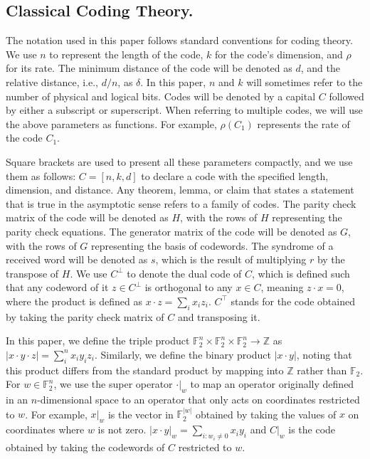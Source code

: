 \documentclass[manuscript,screen,review]{acmart}
\begin{document}
{%
%    


  \subsection{Classical Coding Theory.} \label{sec:classical} The notation used in this paper follows standard conventions for coding theory. We use $n$ to represent the length of the code, $k$ for the code's dimension, and $\rho$ for its rate. The minimum distance of the code will be denoted as $d$, and the relative distance, i.e., $d/n$, as $\delta$. In this paper, $n$ and $k$ will sometimes refer to the number of physical and logical bits. Codes will be denoted by a capital $C$ followed by either a subscript or superscript. When referring to multiple codes, we will use the above parameters as functions. For example, $\rho(C_{1})$ represents the rate of the code $C_{1}$.

Square brackets are used to present all these parameters compactly, and we use them as follows: $C=[n,k,d]$ to declare a code with the specified length, dimension, and distance. Any theorem, lemma, or claim that states a statement that is true in the asymptotic sense refers to a family of codes. The parity check matrix of the code will be denoted as $H$, with the rows of $H$ representing the parity check equations. The generator matrix of the code will be denoted as $G$, with the rows of $G$ representing the basis of codewords. The syndrome of a received word will be denoted as $s$, which is the result of multiplying $r$ by the transpose of $H$. We use $C^\perp$ to denote the dual code of $C$, which is defined such that any codeword of it $z\in C^\perp$ is orthogonal to any $x\in C$, meaning $z\cdot x = 0$, where the product is defined as $x\cdot z = \sum_{i}{x_{i}z_{i}}$. $C^{\top}$ stands for the code obtained by taking the parity check matrix of $C$ and transposing it.

In this paper, we define the triple product $\mathbb{F}_2^{n}\times \mathbb{F}_2^{n}\times\mathbb{F}_2^{n} \rightarrow \mathbb{Z}$ as $|x\cdot y \cdot z| = \sum_{i}^{n}{x_{i}y_{i}z_{i}}$. Similarly, we define the binary product $|x \cdot y|$, noting that this product differs from the standard product by mapping into $\mathbb{Z}$ rather than $\mathbb{F}_{2}$. For $w \in \mathbb{F}_{2}^{n}$, we use the super operator $ \cdot |_{w} $ to map an operator originally defined in an $n$-dimensional space to an operator that only acts on coordinates restricted to $w$. For example, $x|_{w}$ is the vector in $\mathbb{F}_{2}^{|w|}$ obtained by taking the values of $x$ on coordinates where $w$ is not zero. $|x\cdot y|_{w} = \sum_{i:w_{i}\neq 0}{x_{i}y_{i}}$ and $C|_{w}$ is the code obtained by taking the codewords of $C$ restricted to $w$.




}
\end{document}
